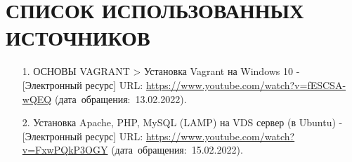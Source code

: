 \documentclass[12pt, a4paper, simple]{eskdtext}
\begin{document}
    \section*{СПИСОК ИСПОЛЬЗОВАННЫХ ИСТОЧНИКОВ}
    \begin{enumerate}
        \item[1.] ОСНОВЫ VAGRANT > Установка Vagrant на Windows 10 - [Электронный ресурс]
        URL: \url{https://www.youtube.com/watch?v=fESCSA-wQEQ}
        (дата~обращения:~13.02.2022).
        \item[2.] Установка Apache, PHP, MySQL (LAMP) на VDS сервер (в Ubuntu) - [Электронный ресурс]
        URL: \url{https://www.youtube.com/watch?v=FxwPQkP3OGY}
        (дата~обращения:~15.02.2022).
    \end{enumerate}
    \newpage
\end{document}
